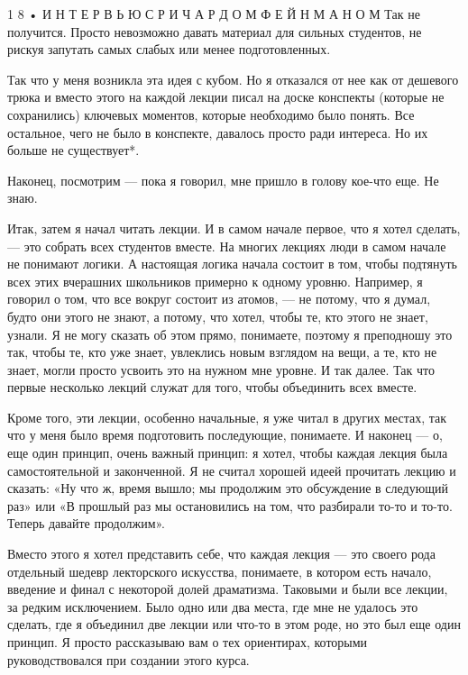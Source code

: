 \documentclass[10pt,oneside]{article}
\begin{document}
1 8 • И Н Т Е Р В Ь Ю  С  Р И Ч А Р Д О М  Ф Е Й Н М А Н О М Так не получится. Просто невозможно давать материал для сильных студентов, не рискуя запутать самых слабых или менее подготовленных.\par

Так что у меня возникла эта идея с кубом. Но я отказался от нее как от дешевого трюка и вместо этого на каждой лекции писал на доске конспекты (которые не сохранились) ключевых моментов, которые необходимо было понять. Все остальное, чего не было в конспекте, давалось просто ради интереса. Но их больше не существует*.\par

Наконец, посмотрим --- пока я говорил, мне пришло в голову кое-что еще. Не знаю.\par

Итак, затем я начал читать лекции. И в самом начале первое, что я хотел сделать, --- это собрать всех студентов вместе. На многих лекциях люди в самом начале не понимают логики. А настоящая логика начала состоит в том, чтобы подтянуть всех этих вчерашних школьников примерно к одному уровню. Например, я говорил о том, что все вокруг состоит из атомов, --- не потому, что я думал, будто они этого не знают, а потому, что хотел, чтобы те, кто этого не знает, узнали. Я не могу сказать об этом прямо, понимаете, поэтому я преподношу это так, чтобы те, кто уже знает, увлеклись новым взглядом на вещи, а те, кто не знает, могли просто усвоить это на нужном мне уровне. И так далее. Так что первые несколько лекций служат для того, чтобы объединить всех вместе.\par

Кроме того, эти лекции, особенно начальные, я уже читал в других местах, так что у меня было время подготовить последующие, понимаете. И наконец --- о, еще один принцип, очень важный принцип: я хотел, чтобы каждая лекция была самостоятельной и законченной. Я не считал хорошей идеей прочитать лекцию и сказать: «Ну что ж, время вышло; мы продолжим это обсуждение в следующий раз» или «В прошлый раз мы остановились на том, что разбирали то-то и то-то. Теперь давайте продолжим».\par

Вместо этого я хотел представить себе, что каждая лекция --- это своего рода отдельный шедевр лекторского искусства, понимаете, в котором есть начало, введение и финал с некоторой долей драматизма. Таковыми и были все лекции, за редким исключением. Было одно или два места, где мне не удалось это сделать, где я объединил две лекции или что-то в этом роде, но это был еще один принцип. Я просто рассказываю вам о тех ориентирах, которыми руководствовался при создании этого курса.\par
\end{document}
